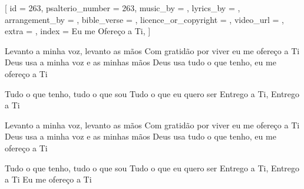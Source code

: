 [
    id                     = {263},
    psalterio_number       = {263},
    music_by               = {},
    lyrics_by              = {},
    arrangement_by         = {},
    bible_verse            = {},
    licence_or_copyright   = {},
    video_url              = {},
    extra                  = {},
    index                  = {Eu me Ofereço a Ti},
]


\beginverse
Levanto a minha voz, levanto as mãos
Com gratidão por viver eu me ofereço a Ti
Deus usa a minha voz e as minhas mãos
Deus usa tudo o que tenho, eu me ofereço a Ti
\endverse


\beginverse
Tudo o que tenho, tudo o que sou
Tudo o que eu quero ser
Entrego a Ti, Entrego a Ti
\endverse


\beginverse
Levanto a minha voz, levanto as mãos
Com gratidão por viver eu me ofereço a Ti
Deus usa a minha voz e as minhas mãos
Deus usa tudo o que tenho, eu me ofereço a Ti
\endverse


\beginverse
Tudo o que tenho, tudo o que sou
Tudo o que eu quero ser
Entrego a Ti, Entrego a Ti
Eu me ofereço a Ti
\endverse

\endsong
